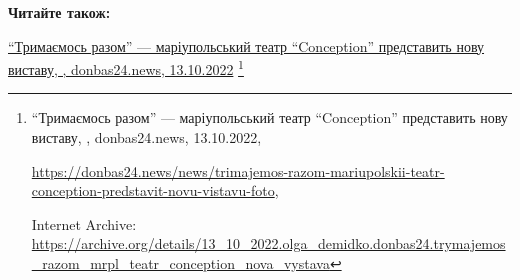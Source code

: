  
 
 
 
 

\def\pubIA{https://archive.org/details/13_10_2022.olga_demidko.donbas24.trymajemos_razom_mrpl_teatr_conception_nova_vystava}
\def\pubTitle{\enquote{Тримаємось разом} — маріупольський театр \enquote{Conception} представить нову виставу}
\def\pubDate{13.10.2022}
\def\pubOrigin{https://donbas24.news/news/trimajemos-razom-mariupolskii-teatr-conception-predstavit-novu-vistavu-foto}
\def\pubAuthor{\pubAuthorDemidko}
\def\pubSite{donbas24.news}

\textbf{Читайте також:}\par \href{\pubIA}{%
\pubTitle, \pubAuthor, \pubSite, \pubDate}%
\footnote{\pubTitle, \pubAuthor, \pubSite, \pubDate, \par\url{\pubOrigin}, \par Internet Archive: \url{\pubIA}}
